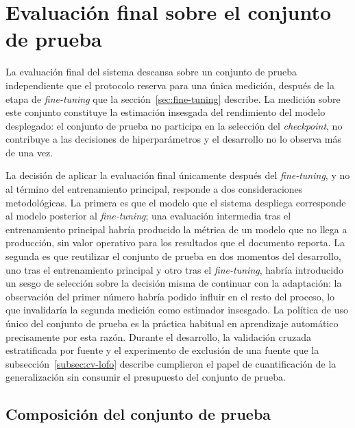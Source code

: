 \section{Evaluación final sobre el conjunto de prueba}
\label{sec:test-set}

La evaluación final del sistema descansa sobre un conjunto de prueba independiente que el protocolo reserva para una única medición, después de la etapa de \textit{fine-tuning} que la sección~\ref{sec:fine-tuning} describe. La medición sobre este conjunto constituye la estimación insesgada del rendimiento del modelo desplegado: el conjunto de prueba no participa en la selección del \textit{checkpoint}, no contribuye a las decisiones de hiperparámetros y el desarrollo no lo observa más de una vez.

La decisión de aplicar la evaluación final únicamente después del \textit{fine-tuning}, y no al término del entrenamiento principal, responde a dos consideraciones metodológicas. La primera es que el modelo que el sistema despliega corresponde al modelo posterior al \textit{fine-tuning}; una evaluación intermedia tras el entrenamiento principal habría producido la métrica de un modelo que no llega a producción, sin valor operativo para los resultados que el documento reporta. La segunda es que reutilizar el conjunto de prueba en dos momentos del desarrollo, uno tras el entrenamiento principal y otro tras el \textit{fine-tuning}, habría introducido un sesgo de selección sobre la decisión misma de continuar con la adaptación: la observación del primer número habría podido influir en el resto del proceso, lo que invalidaría la segunda medición como estimador insesgado. La política de uso único del conjunto de prueba es la práctica habitual en aprendizaje automático precisamente por esta razón. Durante el desarrollo, la validación cruzada estratificada por fuente y el experimento de exclusión de una fuente que la subsección~\ref{subsec:cv-lofo} describe cumplieron el papel de cuantificación de la generalización sin consumir el presupuesto del conjunto de prueba.

\subsection{Composición del conjunto de prueba}
\label{subsec:test-composicion}

